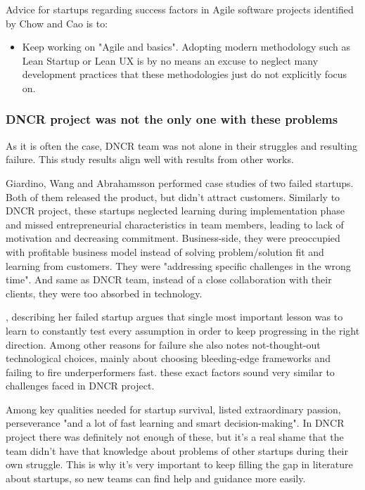 \documentclass{article}
\begin{document}
Advice for startups regarding success factors in Agile software projects identified by Chow and Cao is to:
\begin{itemize}
\item Keep working on "Agile and basics". Adopting modern methodology such as Lean Startup or Lean UX is by no means an excuse to neglect many development practices that these methodologies just do not explicitly focus on.
\end{itemize}

\subsubsection{DNCR project was not the only one with these problems}
As it is often the case, DNCR team was not alone in their struggles and resulting failure. This study results align well with results from other works.

Giardino, Wang and Abrahamsson \citep{giardino2014early} performed case studies of two failed startups. Both of them released the product, but didn't attract customers. Similarly to DNCR project, these startups neglected learning during implementation phase and missed entrepreneurial characteristics in team members, leading to lack of motivation and decreasing commitment. Business-side, they were preoccupied with profitable business model instead of solving problem/solution fit and learning from customers. They were "addressing specific challenges in the wrong time". And same as DNCR team, instead of a close collaboration with their clients, they were too absorbed in technology.

\cite{may2012applying}, describing her failed startup argues that single most important lesson was to learn to constantly test every assumption in order to keep progressing in the right direction. Among other reasons for failure she also notes not-thought-out technological choices, mainly about choosing bleeding-edge frameworks and failing to fire underperformers fast. these exact factors sound very similar to challenges faced in DNCR project.

Among key qualities needed for startup survival, \citeauthor{may2012applying} listed extraordinary passion, perseverance "and a lot of fast learning and smart decision-making". In DNCR project there was definitely not enough of these, but it's a real shame that the team didn't have that knowledge about problems of other startups during their own struggle. This is why it's very important to keep filling the gap in literature about startups, so new teams can find help and guidance more easily.
\end{document}
